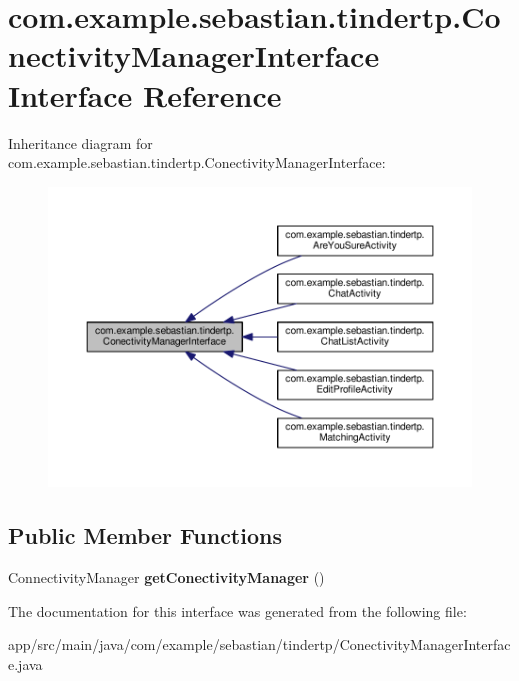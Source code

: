 \hypertarget{interfacecom_1_1example_1_1sebastian_1_1tindertp_1_1ConectivityManagerInterface}{}\section{com.\+example.\+sebastian.\+tindertp.\+Conectivity\+Manager\+Interface Interface Reference}
\label{interfacecom_1_1example_1_1sebastian_1_1tindertp_1_1ConectivityManagerInterface}


Inheritance diagram for com.\+example.\+sebastian.\+tindertp.\+Conectivity\+Manager\+Interface\+:\nopagebreak
\begin{figure}[H]
\begin{center}
\leavevmode
\includegraphics[width=350pt]{interfacecom_1_1example_1_1sebastian_1_1tindertp_1_1ConectivityManagerInterface__inherit__graph}
\end{center}
\end{figure}
\subsection*{Public Member Functions}
\begin{DoxyCompactItemize}
\item 
Connectivity\+Manager {\bfseries get\+Conectivity\+Manager} ()\hypertarget{interfacecom_1_1example_1_1sebastian_1_1tindertp_1_1ConectivityManagerInterface_aa878c3eb70526919ea75eec3b4e17e59}{}\label{interfacecom_1_1example_1_1sebastian_1_1tindertp_1_1ConectivityManagerInterface_aa878c3eb70526919ea75eec3b4e17e59}

\end{DoxyCompactItemize}


The documentation for this interface was generated from the following file\+:\begin{DoxyCompactItemize}
\item 
app/src/main/java/com/example/sebastian/tindertp/Conectivity\+Manager\+Interface.\+java\end{DoxyCompactItemize}
